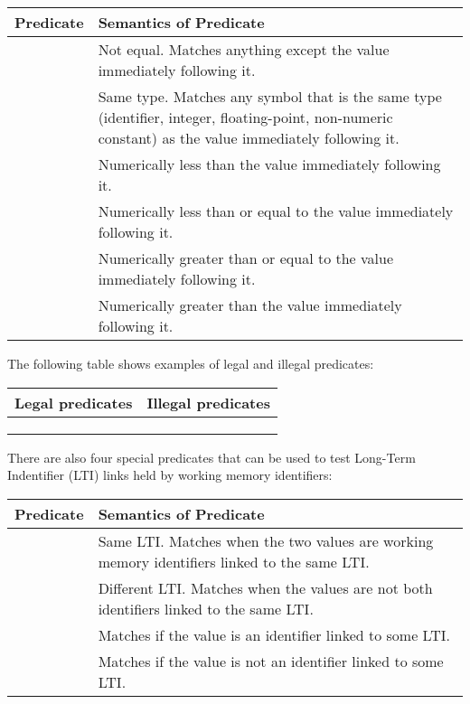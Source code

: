 \begin{tabularx}{\textwidth}{| l | X |} 
	\hline
	\bf{Predicate} &  \bf{Semantics of Predicate} \\ 
	\hline
	\soar{<>}  & Not equal. Matches anything except the value immediately following it. \\
	\soar{<=>} & Same type.  Matches any symbol that is the same type (identifier, 
	             integer, floating-point, non-numeric constant) as the value 
	             immediately following it. \\
	\soar{<}   & Numerically less than the value immediately following it. \\
	\soar{<=}  & Numerically less than or equal to the value immediately 
	             following it. \\
	\soar{>=}  & Numerically greater than or equal to the value immediately 
	             following it. \\
	\soar{>}   & Numerically greater than the value immediately following it. \\  
	\hline 
\end{tabularx} 
\vspace{10pt}


The following table shows examples of legal and illegal predicates:

\begin{tabular}{| l | l |} 
	\hline
	\bf{Legal predicates} &  \bf{Illegal predicates} \\ 
	\hline
	\soar{> <valuex>} & \soar{> > <valuey>} \\
	\soar{< 1}  & \soar{1 >} \\
	\soar{<=> <y>} & \soar{= 10} \\  \hline
\end{tabular} \vspace{10pt}

There are also four special predicates that can be used to test Long-Term Indentifier (LTI) links held by working memory identifiers: 

\begin{tabularx}{\textwidth}{| l | X |} 
	\hline
	\bf{Predicate} &  \bf{Semantics of Predicate} \\ 
	\hline
	\soar{@}  & Same LTI. Matches when the two values are working memory identifiers linked to the same LTI. \\
	\soar{!@} & Different LTI.  Matches when the values are not both identifiers linked to the same LTI. \\
	\soar{@+} & Matches if the value is an identifier linked to some LTI. \\
	\soar{@-} & Matches if the value is not an identifier linked to some LTI. \\
	\hline 
\end{tabularx} 
\vspace{10pt}

